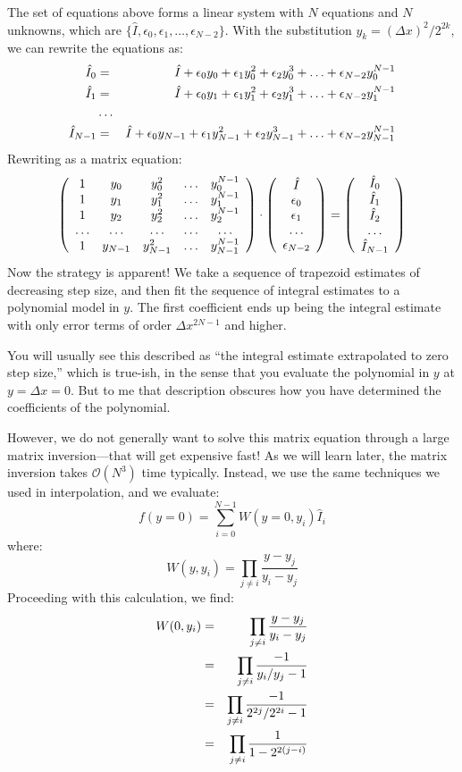 The set of equations above forms a linear system with $N$ equations
and $N$ unknowns, which are $\{\hat
I, \epsilon_0, \epsilon_1, \ldots, \epsilon_{N-2}\}$. With the
substitution $y_k=(\Delta x)^2/2^{2k}$, we can rewrite the equations as: 
\begin{eqnarray}
\hat I_0 &=& \hat I +
\epsilon_0 y_0 + 
\epsilon_1 y_0^2 +
\epsilon_2 y_0^3
+ \ldots + \epsilon_{N-2} y_0^{N-1}\cr
\hat I_1 &=& \hat I + 
\epsilon_0 y_1 + 
\epsilon_1 y_1^2 +
\epsilon_2 y_1^3
+ \ldots + \epsilon_{N-2} y_1^{N-1}\cr
&\ldots& \cr
\hat I_{N-1} &=& \hat I +
\epsilon_0 y_{N-1} + 
\epsilon_1 y_{N-1}^2 +
\epsilon_2 y_{N-1}^3
+ \ldots + \epsilon_{N-2} y_{N-1}^{N-1}
\end{eqnarray}
Rewriting as a matrix equation:
\begin{equation}
\left(\begin{array}{ccccc}
1 & y_0 & y_0^2 & \ldots & y_0^{N-1} \cr
1 & y_1 & y_1^2 & \ldots & y_1^{N-1} \cr
1 & y_2 & y_2^2 & \ldots & y_2^{N-1} \cr
\ldots & \ldots & \ldots & \ldots & \ldots \cr
1 & y_{N-1} & y_{N-1}^2 & \ldots & y_{N-1}^{N-1} \cr
\end{array}\right)
\cdot
\left(\begin{array}{c}
\hat I \cr
\epsilon_0 \cr
\epsilon_1 \cr
\ldots \cr
\epsilon_{N-2}
\end{array}\right)
= 
\left(\begin{array}{c}
\hat I_0 \cr
\hat I_1 \cr
\hat I_2 \cr
\ldots \cr
\hat I_{N-1}
\end{array}\right)
\end{equation}
Now the strategy is apparent! We take a sequence of trapezoid
estimates of decreasing step size, and then fit the sequence of
integral estimates to a polynomial model in $y$. The first coefficient
ends up being the integral estimate with only error terms of order
$\Delta x^{2N-1}$ and higher.

You will usually see this described as ``the integral estimate
extrapolated to zero step size,'' which is true-ish, in the sense that
you evaluate the polynomial in $y$ at $y=\Delta x=0$. But to me that
description obscures how you have determined the coefficients of the
polynomial.

However, we do not generally want to solve this matrix equation
through a large matrix inversion---that will get expensive fast! As we
will learn later, the matrix inversion takes $\mathcal{O}(N^3)$ time
typically.  Instead, we use the same techniques we used in
interpolation, and we evaluate:
\begin{equation}
f(y=0) = \sum_{i=0}^{N-1} W(y=0, y_i) \hat I_i
\end{equation}
where:
\begin{equation}
W(y, y_i) = \prod_{j\ne i} \frac{y - y_j}{y_i - y_j}
\end{equation}
Proceeding with this calculation, we find: 
\begin{eqnarray}
W(0, y_i) &=& \prod_{j\ne i} \frac{y - y_j}{y_i - y_j} \cr
 &=& \prod_{j\ne i} \frac{- 1}{y_i / y_j - 1} \cr
 &=& \prod_{j\ne i} \frac{- 1}{2^{2j} / 2^{2i} - 1} \cr
 &=& \prod_{j\ne i} \frac{1}{1 - 2^{2(j-i)}}
\end{eqnarray}

